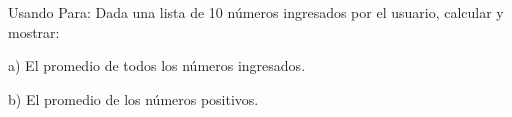 ﻿
Usando Para: Dada una lista de 10 números ingresados por el usuario, calcular y mostrar:

a) El promedio de todos los números ingresados.

b) El promedio de los números positivos.


\newpage
{}

\volverindice
\newpage
